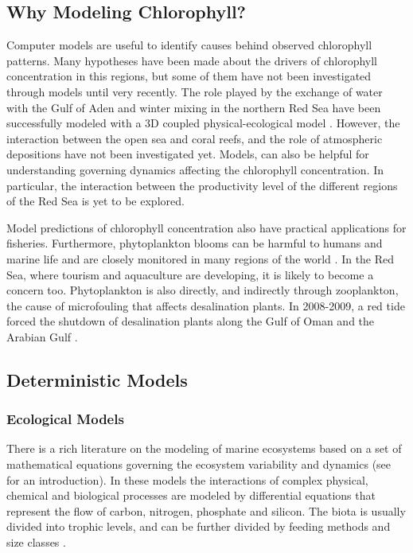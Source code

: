 \subsection{Why Modeling Chlorophyll?}

Computer models are useful to identify causes behind observed chlorophyll
patterns.  Many hypotheses have been made about the drivers of chlorophyll
concentration in this regions, but some of them have not been investigated
through models until very recently. The role played by the exchange of water
with the Gulf of Aden and winter mixing in the northern Red Sea have been
successfully modeled with a 3D coupled physical-ecological model
\citep{Yao2014, Yao2014b, Triantafyllou2014}.  However, the interaction between
the open sea and coral reefs, and the role of atmospheric depositions have not
been investigated yet.  Models, can also be helpful for understanding governing
dynamics affecting the chlorophyll concentration. In particular, the
interaction between the productivity level of the different regions of the Red
Sea is yet to be explored.

Model predictions of chlorophyll concentration also have practical applications
for fisheries. Furthermore, phytoplankton blooms can be harmful to humans and
marine life and are closely monitored in many regions of the world
\citep{Pettersson2013}. In the Red Sea, where tourism and aquaculture are
developing, it is likely to become a concern too. Phytoplankton is also
directly, and indirectly through zooplankton, the cause of microfouling that
affects desalination plants. In 2008-2009, a red tide forced the shutdown of
desalination plants along the Gulf of Oman and the Arabian Gulf
\citep{Richlen2010}.


\subsection{Deterministic Models}

\subsubsection{Ecological Models}

There is a rich literature on the modeling of marine ecosystems based on a set
of mathematical equations governing the ecosystem variability and dynamics (see
\citet{Fennel2004} for an introduction). In these models the interactions of
complex physical, chemical and biological processes are modeled by differential
equations that represent the flow of carbon, nitrogen, phosphate and silicon.
The biota is usually divided into trophic levels, and can be
further divided by feeding methods and size classes \citep{Baretta1995,
Triantafyllou2014}.

